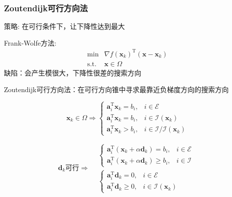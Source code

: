 \subsubsection{Zoutendijk可行方向法}
策略: 在可行条件下，让下降性达到最大

Frank-Wolfe方法:
\[
    \begin{aligned}
        \min&\nabla f(\boldsymbol{x}_k)^\mathrm{T}(\boldsymbol{x}-\boldsymbol{x}_k)\\
        \mathrm{s.t.}&\boldsymbol{x}\in\Omega
    \end{aligned}
\]
缺陷：会产生模很大，下降性很差的搜索方向

Zoutendijk可行方向法：在可行方向锥中寻求最靠近负梯度方向的搜索方向 

\[
    \boldsymbol{x}_{k}\in\Omega\Rightarrow
    \left\{
        \begin{array}{ll}
            \boldsymbol{a}_i^\mathrm{T}\boldsymbol{x}_k=b_i,&i\in\mathcal{E}\\
            \boldsymbol{a}_i^\mathrm{T}\boldsymbol{x}_k=b_i,&i\in\mathcal{I}(\boldsymbol{x}_k)\\
            \boldsymbol{a}_i^\mathrm{T}\boldsymbol{x}_k>b_i,&i\in\mathcal{I}/\mathcal{I}(\boldsymbol{x}_k)
        \end{array}
    \right. 
\]

\[
    \boldsymbol{d}_{k}\text{可行}\Rightarrow
    \begin{aligned}
        &\left\{
            \begin{array}{ll}
                \boldsymbol{a}_{i}^{\mathrm{T}}(\boldsymbol{x}_{k}+\alpha\boldsymbol{d}_{k})=b_{i},&i\in\mathcal{E}\\
                \boldsymbol{a}_{i}^{\mathrm{T}}(\boldsymbol{x}_{k}+\alpha\boldsymbol{d}_{k})\geqslant b_{i},&i\in\mathcal{I}
            \end{array}
            \right.\\
            &\left\{
                \begin{array}{ll}
                    \boldsymbol{a}_{i}^{\mathrm{T}}\boldsymbol{d}_{k}=0,&i\in\mathcal{E}\\
                    \boldsymbol{a}_{i}^{\mathrm{T}}\boldsymbol{d}_{k}\geqslant0,&i\in\mathcal{I}(\boldsymbol{x}_{k})
                \end{array}
                \right.
    \end{aligned}
\]

